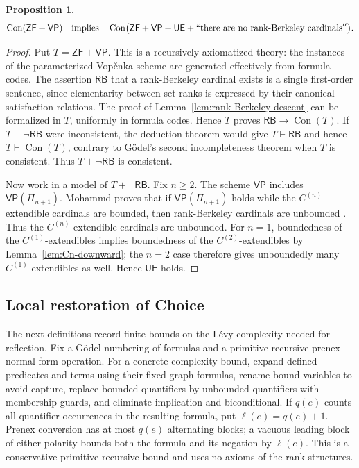 \documentclass[11pt,a4paper]{amsart}
\newcommand{\VP}{\mathsf{VP}}
\newcommand{\ZF}{\mathsf{ZF}}
\newcommand{\Con}{\operatorname{Con}}
\newcommand{\UE}{\mathsf{UE}}
\theoremstyle{plain}
\newtheorem{proposition}[theorem]{Proposition}
\theoremstyle{definition}
\theoremstyle{remark}
\begin{document}
\begin{proposition}\label{prop:OH-pruning}
\[
\Con(\ZF+\VP)\quad\text{implies}\quad
\Con\bigl(\ZF+\VP+\UE+``\text{there are no rank-Berkeley cardinals}''\bigr).
\]
\end{proposition}

\begin{proof}
Put $T=\ZF+\VP$.  This is a recursively axiomatized theory: the instances of the parameterized Vop\v{e}nka scheme are generated effectively from formula codes.  The assertion $\mathsf{RB}$ that a rank-Berkeley cardinal exists is a single first-order sentence, since elementarity between set ranks is expressed by their canonical satisfaction relations.  The proof of Lemma~\ref{lem:rank-Berkeley-descent} can be formalized in $T$, uniformly in formula codes.  Hence $T$ proves $\mathsf{RB}\longrightarrow\Con(T)$.
If $T+\neg\mathsf{RB}$ were inconsistent, the deduction theorem would give $T\vdash\mathsf{RB}$ and hence $T\vdash\Con(T)$, contrary to G\"odel's second incompleteness theorem when $T$ is consistent.  Thus $T+\neg\mathsf{RB}$ is consistent.

{Now work in a model of $T+\neg\mathsf{RB}$.  Fix $n\geq2$.  {The scheme $\VP$ includes $\VP(\Pi_{n+1})$.}  Mohammd proves that if $\VP(\Pi_{n+1})$ holds while the $C^{(n)}$-extendible cardinals are bounded, then rank-Berkeley cardinals are unbounded \cite[Proposition~6.5 and Theorem~6.7]{Mohammd}.}  Thus the $C^{(n)}$-extendible cardinals are unbounded.  For $n=1$, boundedness of the $C^{(1)}$-extendibles implies boundedness of the $C^{(2)}$-extendibles by Lemma~\ref{lem:Cn-downward}; the $n=2$ case therefore gives unboundedly many $C^{(1)}$-extendibles as well.  Hence $\UE$ holds.
\end{proof}

\subsection*{{Local restoration of Choice}}

\begingroup

The next definitions record finite bounds on the L\'evy complexity needed for reflection.  Fix a G\"odel numbering of formulas and a primitive-recursive prenex-normal-form operation.  For a concrete complexity bound, expand defined predicates and terms using their fixed graph formulas, rename bound variables to avoid capture, replace bounded quantifiers by unbounded quantifiers with membership guards, and eliminate implication and biconditional.  If $q(e)$ counts all quantifier occurrences in the resulting formula, put $\ell(e)=q(e)+1$.  Prenex conversion has at most $q(e)$ alternating blocks; a vacuous leading block of either polarity bounds both the formula and its negation by $\ell(e)$.  This is a conservative primitive-recursive bound and uses no axioms of the rank structures.
\end{document}
